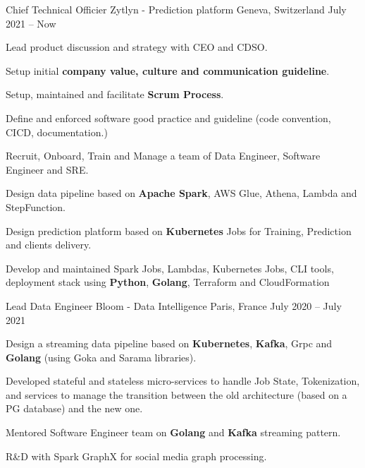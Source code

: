 

\begin{cventries}

\cventry
  {Chief Technical Officier} %
  {Zytlyn - Prediction platform} %
  {Geneva, Switzerland} %
  {July 2021 – Now} %
  {
    \begin{cvitems} %
      \item {Lead product discussion and strategy with CEO and CDSO.}
      \item {Setup initial \textbf{company value, culture and communication guideline}.}
      \item {Setup, maintained and facilitate \textbf{Scrum Process}.}
      \item {Define and enforced software good practice and guideline (code convention, CICD, documentation.)}
      \item {Recruit, Onboard, Train and Manage a team of Data Engineer, Software Engineer and SRE.}
      \item {Design data pipeline based on \textbf{Apache Spark}, AWS Glue, Athena, Lambda and StepFunction.}
      \item {Design prediction platform based on \textbf{Kubernetes} Jobs for Training, Prediction and clients delivery.}
      \item {Develop and maintained Spark Jobs, Lambdas, Kubernetes Jobs, CLI tools, deployment stack using \textbf{Python}, \textbf{Golang}, Terraform and CloudFormation}
    \end{cvitems}
  }

\cventry
  {Lead Data Engineer} %
  {Bloom - Data Intelligence} %
  {Paris, France} %
  {July 2020 – July 2021} %
  {
    \begin{cvitems} %
      \item {Design a streaming data pipeline based on \textbf{Kubernetes}, \textbf{Kafka}, Grpc and \textbf{Golang} (using Goka and Sarama libraries).}
      \item {Developed stateful and stateless micro-services to handle Job State, Tokenization, and services to manage the transition between the old architecture (based on a PG database) and the new one.}
      \item {Mentored Software Engineer team on \textbf{Golang} and \textbf{Kafka} streaming pattern.}
      \item {R\&D with Spark GraphX for social media graph processing.}
    \end{cvitems}
  }


\end{cventries}
